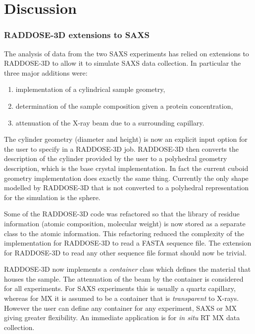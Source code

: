 \section{Discussion}
\label{sec:Discussion - SAXS}

\subsubsection{RADDOSE-3D extensions to SAXS}
\label{subs:RADDOSE-3D extensions to SAXS}

The analysis of data from the two SAXS experiments has relied on extensions to RADDOSE-3D to allow it to simulate SAXS data collection.
In particular the three major additions were:
\begin{enumerate}
    \item implementation of a cylindrical sample geometry,
    \item determination of the sample composition given a protein concentration,
    \item attenuation of the X-ray beam due to a surrounding capillary.
\end{enumerate}
The cylinder geometry (diameter and height) is now an explicit input option for the user to specify in a RADDOSE-3D job.
RADDOSE-3D then converts the description of the cylinder provided by the user to a polyhedral geometry description, which is the base crystal implementation.
In fact the current cuboid geometry implementation does exactly the same thing.
Currently the only shape modelled by RADDOSE-3D that is not converted to a polyhedral representation for the simulation is the sphere.

Some of the RADDOSE-3D code was refactored so that the library of residue information (atomic composition, molecular weight) is now stored as a separate class to the atomic information. This refactoring reduced the complexity of the implementation for RADDOSE-3D to read a FASTA sequence file. The extension for RADDOSE-3D to read any other sequence file format should now be trivial.

RADDOSE-3D now implements a \textit{container} class which defines the material that houses the sample.
The attenuation of the beam by the container is considered for all experiments.
For SAXS experiments this is usually a quartz capillary, whereas for MX it is assumed to be a container that is \textit{transparent} to X-rays.
However the user can define any container for any experiment, SAXS or MX giving greater flexibility.
An immediate application is for \textit{in situ} RT MX data collection.

